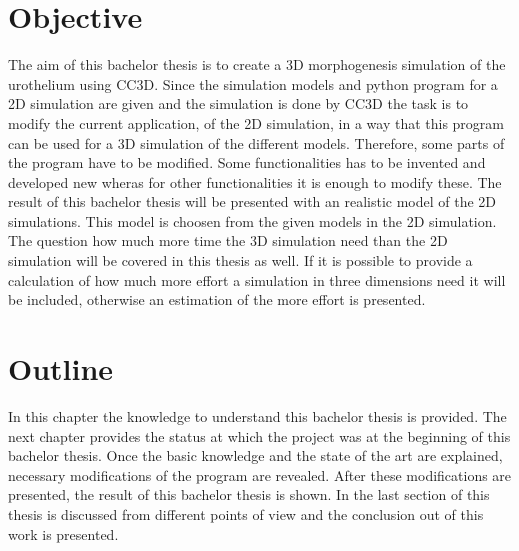 \section{Objective}
The aim of this bachelor thesis is to create a 3D morphogenesis simulation of the urothelium using \ac{CC3D}. Since the simulation models and python program for a 2D simulation are given and the simulation is done by \ac{CC3D} the task is to modify the current application, of the 2D simulation, in a way that this program can be used for a 3D simulation of the different models. \newline
Therefore, some parts of the program have to be modified. Some functionalities has to be invented and developed new wheras for other functionalities it is enough to modify these. \newline
The result of this bachelor thesis will be presented with an realistic model of the 2D simulations. This model is choosen from the given models in the 2D simulation. The question how much more time the 3D simulation need than the 2D simulation will be covered in this thesis as well. If it is possible to provide a calculation of how much more effort a simulation in three dimensions need it will be included, otherwise an estimation of the more effort is presented.


\section{Outline}
In this chapter the knowledge to understand this bachelor thesis is provided. The next chapter provides the status at which the project was at the beginning of this bachelor thesis. Once the basic knowledge and the state of the art are explained, necessary modifications of the program are revealed. After these modifications are presented, the result of this bachelor thesis is shown. In the last section of this thesis is discussed from different points of view and the conclusion out of this work is presented.